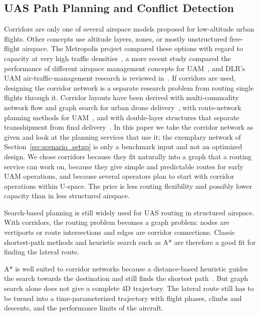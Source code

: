 \subsection{UAS Path Planning and Conflict Detection}

Corridors are only one of several airspace models proposed for low-altitude urban flights. Other concepts use altitude layers, zones, or mostly unstructured free-flight airspace. The Metropolis project compared these options with regard to capacity at very high traffic densities~\cite{sunil2015metropolis,schneider2014metropolis}, a more recent study compared the performance of different airspace management concepts for UAM~\cite{abdellaoui2025_airspace_uam}, and DLR's UAM air-traffic-management research is reviewed in~\cite{schuchardt2023_atm_uam_review}. If corridors are used, designing the corridor network is a separate research problem from routing single flights through it. Corridor layouts have been derived with multi-commodity network flow and graph search for urban drone delivery~\cite{he2025_air_corridor_planning}, with route-network planning methods for UAM~\cite{li2024_uam_route_network}, and with double-layer structures that separate transshipment from final delivery~\cite{li2025_double_layer_route_network}. In this paper we take the corridor network as given and look at the planning services that use it; the exemplary network of Section~\ref{sec:scenario_setup} is only a benchmark input and not an optimized design. We chose corridors because they fit naturally into a graph that a routing service can work on, because they give simple and predictable routes for early UAM operations, and because several operators plan to start with corridor operations within U-space. The price is less routing flexibility and possibly lower capacity than in less structured airspace.

Search-based planning is still widely used for UAS routing in structured airspace. With corridors, the routing problem becomes a graph problem: nodes are vertiports or route intersections and edges are corridor connections. Classic shortest-path methods and heuristic search such as A* are therefore a good fit for finding the lateral route.

A* is well suited to corridor networks because a distance-based heuristic guides the search towards the destination and still finds the shortest path~\cite{sahawneh2016_3d_path_planning,a_star_2d3d_comparison_utm}. But graph search alone does not give a complete 4D trajectory. The lateral route still has to be turned into a time-parameterized trajectory with flight phases, climbs and descents, and the performance limits of the aircraft.

